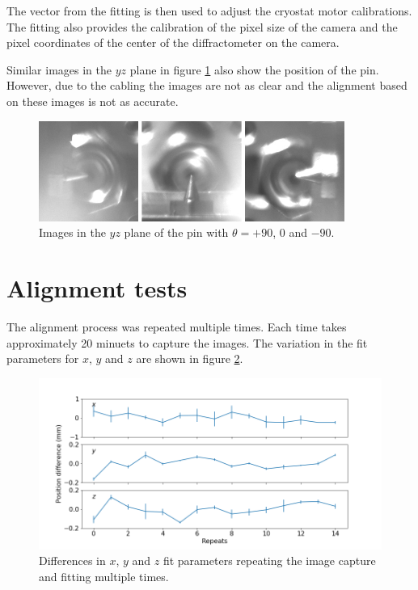\documentclass[a4paper,12pt]{article}
\begin{document}
The vector from the fitting is then used to adjust the cryostat motor calibrations. The fitting also provides the calibration of the pixel size of the camera and the pixel coordinates of the center of the diffractometer on the camera.


Similar images in the $yz$ plane in figure \ref{images_side} also show the position of the pin. However, due to the cabling the images are not as clear and the alignment based on these images is not as accurate.

\begin{figure}[tbh]
	\centering
	\includegraphics[width=10cm]{graphics/images_side.jpg}
	\caption{Images in the $yz$ plane of the pin with $\theta = +90$, $0$ and $-90$.}
	\label{images_side}
\end{figure}







\section{Alignment tests}

The alignment process was repeated multiple times. Each time takes approximately 20 minuets to capture the images. The variation in the fit parameters for $x$, $y$ and $z$ are shown in figure \ref{different_image_variation}.


\begin{figure}[tbh]
	\centering
	\includegraphics[width=17cm]{graphics/different_image_variation.png}
	\caption{Differences in $x$, $y$ and $z$ fit parameters repeating the image capture and fitting multiple times.}
	\label{different_image_variation}
\end{figure}
\end{document}
